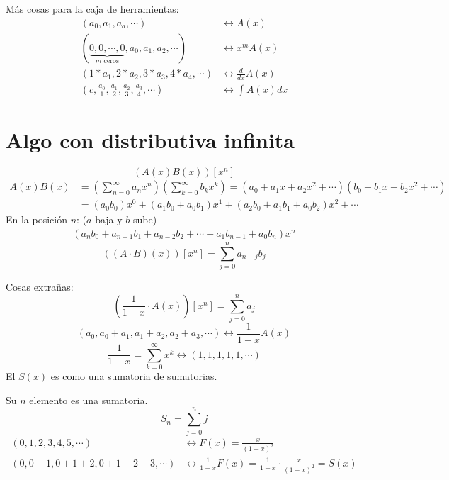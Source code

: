 \documentclass[../main.tex]{subfiles}
\begin{document}
Más cosas para la caja de herramientas:
\begin{align*}
	(a_0,a_1,a_a,\cdots) &\longleftrightarrow A(x)\\
	(
	\underbrace
	{
		0,0,\cdots,0
	}_
	{
		\text{$m$ ceros}
	}
	,a_0,a_1,a_2,\cdots
	) &\longleftrightarrow x^mA(x)\\
	(1*a_1,2*a_2,3*a_3,4*a_4,\cdots) &\longleftrightarrow \frac{d}{dx} A(x)\\
	(
		c,
		\frac{a_0}{1},
		\frac{a_1}{2},
		\frac{a_2}{3},
		\frac{a_3}{4},
		\cdots
	)
	&\longleftrightarrow
	\int A(x)dx
\end{align*}

\section{Algo con distributiva infinita}%
\label{sec:algo_con_distributiva_infinita}
\[
	(A(x)B(x))[x^n]
\]
\begin{align*}
	A(x)B(x) &=
	\left(
		\sum_{n=0}^\infty
		a_nx^n
	\right)
	\left(
		\sum_{k=0}^\infty
		b_kx^k
	\right)
	= (a_0+a_1x+a_2x^2+\cdots)
	(b_0+b_1x+b_2x^2+\cdots)
	\\
	&= (a_0b_0)x^0
	+(a_1b_0+a_0b_1)x^1
	+(a_2b_0+a_1b_1+a_0b_2)x^2 + \cdots
\end{align*}
En la posición $n$: ($a$ baja y $b$ sube)
\begin{align*}
	(a_nb_0+a_{n-1}b_1+a_{n-2}b_2+\cdots+a_1b_{n-1}+a_0b_n)x^n
\end{align*}
\[
	\left((A\cdot B)(x)\right)[x^n] =
	\sum_{j=0}^n
	a_{n-j}b_j
\]

Cosas extrañas:
\[
	\left(
		\frac{1}{1-x} \cdot A(x)
	\right)
	[x^n] =
	\sum_{j=0}^na_j
\]
\[
	(
		a_0,
		a_0+a_1,
		a_1+a_2,
		a_2+a_3,
		\cdots
	)
	\longleftrightarrow
	\frac{1}{1-x} A(x)
\]
\[
	\frac{1}{1-x} =
	\sum_{k=0}^\infty
	x^k
	\longleftrightarrow
	(1,1,1,1,1,\cdots)
\]
El $S(x)$ es como una sumatoria de sumatorias.

Su $n$ elemento es una sumatoria.
\[
	S_n = \sum_{j=0}^n j
\]
\begin{align*}
	(0,1,2,3,4,5,\cdots)
	&\longleftrightarrow
	F(x)
	= \frac{x}{(1-x)^2}
	\\
	(
		0,
		0+1,
		0+1+2,
		0+1+2+3,
		\cdots
	)
	&\longleftrightarrow
	\frac{1}{1-x} F(x)
	= \frac{1}{1-x}
	\cdot \frac{x}{(1-x)^2}
	= S(x)
\end{align*}
\end{document}
